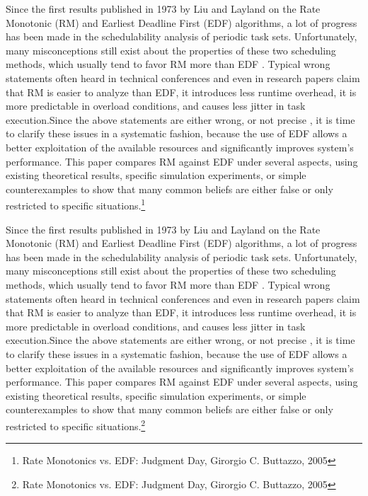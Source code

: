 	\begin{frame}{\subsecname}
\tiny Since the first results published in 1973 by Liu and Layland on the Rate Monotonic (RM) and Earliest Deadline First (EDF) algorithms, a lot of progress has been made in the schedulability analysis of periodic task sets. Unfortunately, many \Large misconceptions \tiny still exist about the properties of these two scheduling methods, which usually tend to \Large favor RM more than EDF \tiny. Typical wrong statements often heard in technical conferences and even in research papers claim that RM is easier to analyze than EDF, it introduces less runtime overhead, it is more predictable in overload conditions, and causes less jitter in task execution.Since the above statements are \Large  either wrong, or not precise \tiny, it is time to clarify these issues in a systematic fashion, because the use of EDF allows a better exploitation of the available resources and significantly improves system’s performance. This paper compares RM against EDF under several aspects, using existing theoretical results, specific simulation experiments, or simple counterexamples to show that many common beliefs are either false or only restricted to specific situations.\footnote{Rate Monotonics vs. EDF: Judgment Day, Girorgio C. Buttazzo, 2005}
\end{frame}
	
\begin{frame}{\subsecname}
\tiny Since the first results published in 1973 by Liu and Layland on the Rate Monotonic (RM) and Earliest Deadline First (EDF) algorithms, a lot of progress has been made in the schedulability analysis of periodic task sets. Unfortunately, many \Large misconceptions \tiny still exist about the properties of these two scheduling methods, which usually tend to \Large favor RM more than EDF \tiny. Typical wrong statements often heard in technical conferences and even in research papers claim that RM is easier to analyze than EDF, it introduces less runtime overhead, it is more predictable in overload conditions, and causes less jitter in task execution.Since the above statements are \Large  either wrong, or not precise \tiny, it is time to clarify these issues in a systematic fashion, because the use of EDF allows a better exploitation of the available resources and significantly improves system’s performance. \Large This paper compares RM against EDF \tiny under several aspects, using existing theoretical results, specific simulation experiments, or simple counterexamples to show that many common beliefs are either false or only restricted to specific situations.\footnote{Rate Monotonics vs. EDF: Judgment Day, Girorgio C. Buttazzo, 2005}
\end{frame}



